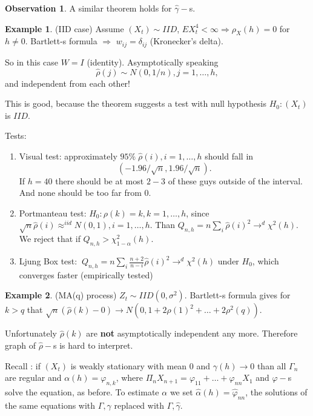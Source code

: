 \documentclass[12pt,a4paper, notitlepage]{book}
\theoremstyle{definition} %
\newtheorem{example}{Example}[chapter]
\newtheorem*{observation}{Observation}
\theoremstyle{plain} %
\begin{document}
\begin{observation}
A similar theorem holds for $\hat{\gamma}-$s. 
\end{observation}


\begin{example}(IID case)
Assume $(X_t) \sim IID$, $EX_t^4 < \infty \Rightarrow \rho_X(h) = 0$ for $h \neq 0$. Bartlett-s formula $\Rightarrow$
$w_{ij} = \delta_{ij}$ (Kronecker's delta).

So in this case $W = I$ (identity). Asymptotically speaking 
\[ \hat{\rho}(j) \sim N(0, 1/n), j=1, \dots, h , \]
 and independent from each other! 
\end{example}

This is good, because the theorem suggests a test with null hypothesis $H_0: (X_t)$ is $ IID$.

Tests:
\begin{enumerate}
\item Visual test: approximately $95\%\; \hat{\rho}(i), i = 1, \dots, h$ should fall in 
\[  (-1.96/\sqrt{n},1.96/\sqrt{n}). \]
 If $h = 40$ there should be at most $2-3$ of these guys outside of the interval. And none should be too far from $0$.
\item Portmanteau test: $H_0: \rho(k) = k, k = 1, \dots, h$, since $\sqrt{n}\hat{\rho}(i) \approx^{iid} N(0,1), i = 1, \dots, h$. Than $Q_{n,h} = n \sum_i \hat{\rho}(i)^2 \rightarrow^d \chi^2(h)$. We reject that if $Q_{n,h} > \chi^2_{1-\alpha}(h)$.
\item Ljung Box test: $~Q_{n, h} = n \sum_i \frac{n+2}{n-i}\hat{\rho}(i)^2 \rightarrow^d \chi^2(h)$ under $H_0$, which converges faster (empirically tested)
\end{enumerate}

\begin{example} (MA(q) process)
$Z_t \sim IID(0, \sigma^2)$. Bartlett-s formula gives for $k > q$ that 
$\sqrt{n} (\hat{\rho}(k) - 0) \rightarrow N(0, 1 + 2\rho(1)^2 + \dots + 2\rho^2(q))$.

Unfortunately $\hat{\rho}(k)$ are {\bf not} asymptotically independent any more. Therefore graph of $\hat{\rho}-$s is hard to interpret.
\end{example}

Recall : if $(X_t)$ is weakly stationary with mean $0$ and $\gamma(h) \rightarrow 0$ than all $\Gamma_n$ are regular and 
$\alpha(h) = \varphi_{n,k}$, where $\Pi_{n} X_{n+1} = \varphi_{11} + \dots + \varphi_{n n}X_1$ and $\varphi -$s solve the equation, as before.
To estimate $\alpha$ we set $\hat{\alpha}(h) = \hat{\varphi}_{n n}$, the solutions of the same equations with $\Gamma, \gamma$ replaced with $\hat{\Gamma}, \hat{\gamma}$. 
\end{document}
